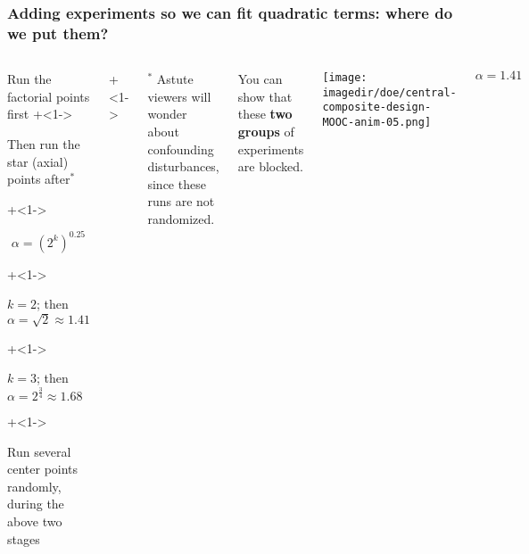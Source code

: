 \documentclass[handout,11pt,aspectratio=169,mathserif]{beamer}
\begin{document}
\begin{frame}\frametitle{Adding experiments so we can fit quadratic terms: where do we put them?}
	\begin{columns}[T]
		
			\vspace{1cm}
			
			\begin{itemize}
				\item	Run the factorial points first
				\onslide+<1->{
					\item	Then run the star (axial) points after$^\ast$
				}
				\onslide+<1->{
					\Large
					\[\alpha  = \left(2^k\right)^{0.25}\]
					
			
					\begin{itemize}
						\onslide+<1->{\item	$k = 2$; then $\alpha = \sqrt{2} \approx 1.41$ }
						\onslide+<1->{\item	$k = 3$; then $\alpha = 2^{\tfrac{3}{4}} \approx 1.68$}
					\end{itemize}
					\normalsize
				}
				\onslide+<1->{
					\item	Run several center points randomly, during the above two stages
				}
			\end{itemize}
			
			\onslide+<1->{
				\vspace{0cm}
				\tiny
				$^\ast$ Astute viewers will wonder about confounding disturbances, since these runs are not randomized.
			
				You can show that these {\color[rgb]{0,0.5,1}\textbf{two}} {\color[rgb]{0.5,0, 0.5}\textbf{groups}} of experiments are blocked.
			}
			
			
			\centerline{\texttt{[image: \\imagedir/doe/central-composite-design-MOOC-anim-05.png]}}
			
			\vspace{-0.5cm}
			\[\alpha = 1.41\]
	\end{columns}
\end{frame}
\end{document}

